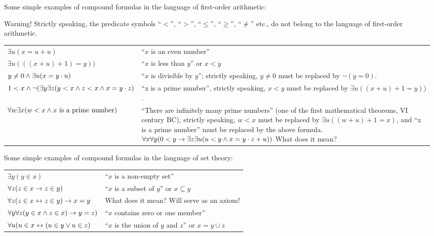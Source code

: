 \begin{example}
Some simple examples of compound formulas in the language of first-order arithmetic:

Warning! Strictly speaking, the predicate symbols ``\(<\)'', ``\(>\)'', ``\(\leq\)'', ``\(\geq\)'', ``\(\ne\)'' etc., do not belong to the language of first-order arithmetic.

\begin{center}
\begin{tabular}{p{7cm} p{8cm}}
\(\exists u(x=u+u)\)
& ``\(x\) is an even number'' \\
\(\exists u(((x+u)+1)=y))\)
& ``\(x\) is less than \(y\)'' or \(x<y\) \\
\(y\neq0 \wedge  \exists u(x=y\cdot u)\)
& ``\(x\) is divisible by \(y\)''; strictly speaking, \(y\neq0\) must be replaced by \(\neg(y=0)\). \\
\(1<x\wedge\neg (\exists y\exists z(y<x\wedge z<x\wedge x=y\cdot z)\)
& ``x is a prime number'', strictly speaking, \(x<y\) must be replaced by \(\exists u((x+u)+1=y))\). \\
\(\forall w\exists x(w<x\wedge x\text{ is a prime number})\)
& ``There are infinitely many prime numbers'' (one of the first mathematical theorems, VI century BC), strictly speaking, \(w<x\) must be replaced by \(\exists u((w+u)+1=x)\), and ``x is a prime number'' must be replaced by the above formula.
\(\forall x\forall y(0<y \rightarrow  \exists z\exists u(u<y \wedge  x=y\cdot z+u))\) What does it mean?
\end{tabular}
\end{center}
\end{example}

\begin{example}
Some simple examples of compound formulas in the language of set theory:
\begin{center}
\begin{tabular}{l l}
\(\exists y(y \in x)\)
& ``\(x\) is a non-empty set'' \\
\(\forall z (z \in x\rightarrow z \in y)\)
& ``\(x\) is a subset of \(y\)'' or \(x\subseteq y\) \\
\(\forall z (z\in x\leftrightarrow z\in y)\rightarrow x=y\)
& What does it mean? Will serve as an axiom! \\
\(\forall y\forall z(y\in x \wedge z\in x)\rightarrow y=z)\)
& ``\(x\) contains zero or one member'' \\
\(\forall u (u\in x\leftrightarrow (u\in y \vee u\in z)\)
& ``\(x\) is the union of \(y\) and \(z\)'' or \(x=y\cup z\)
\end{tabular}
\end{center}
\end{example}

